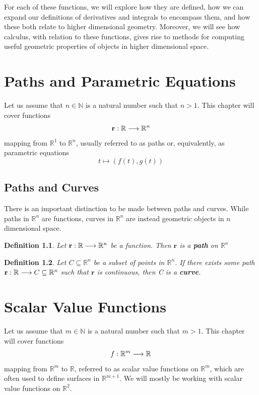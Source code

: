 \documentclass[12pt]{book}
\newcommand{\setst}[1]{\def\st{#1} \def\suchthat{#1}}
\newcommand{\rbb}{\mathbb{R}}
\newcommand{\rbbn}{\mathbb{R}^n}
\theoremstyle{definitionstyle}
\newtheorem{definition}{Definition}[section]
\numberwithin{equation}{section}
\begin{document}
\vspace{0.5cm}

For each of these functions, we will explore how they are defined, how we can expand our definitions of derivatives and integrals to encompass them, and how these both relate to higher dimensional geometry. Moreover, we will see how calculus, with relation to these functions, gives rise to methods for computing useful geometric properties of objects in higher dimensional space.

\chapter{Paths and Parametric Equations}

\setst{ : }
Let us assume that $n \in \mathbb{N}$ is a natural number such that $n > 1$. This chapter will cover functions 
\begin{equation}
    \fpath{r}{n}
\end{equation}
mapping from $\rbb^1$ to $\rbbn$, usually referred to as paths or, equivalently, as parametric equations
\begin{equation}
    t \longmapsto (f(t),g(t))
\end{equation}

\section{Paths and Curves}

There is an important distinction to be made between paths and curves. While paths in $\rbbn$ are functions, curves in $\rbbn$ are instead geometric objects in $n$ dimensional space.

\begin{definition}
    Let $\fpath{r}{n}$ be a function. Then $\mathbf{r}$ is a \textbf{path} on $\rbbn$
\end{definition}
\begin{definition}
    Let $C \subseteq \rbbn$ be a subset of points in $\rbbn$. If there exists some path $\func{\mathbf{r}}{\rbb}{C\subseteq\rbbn}$ such that $\mathbf{r}$ is continuous, then C is a \textbf{curve}.
\end{definition}


\chapter{Scalar Value Functions}

Let us assume that $m \in \mathbb{N}$ is a natural number such that $m > 1$. This chapter will cover functions
\begin{equation}
	\func{f}{\rbb^m}{\rbb}
\end{equation}
mapping from $\rbb^m$ to $\rbb$, referred to as scalar value functions on $\rbb^m$, which are often used to define surfaces in $\rbb^{m+1}$. We will mostly be working with scalar value functions on $\rbb^2$.
\end{document}
